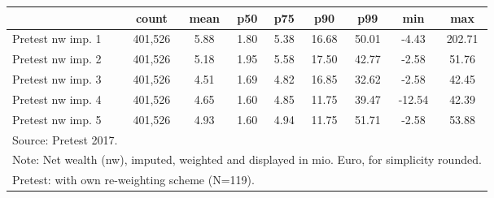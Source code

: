 {
\def\sym#1{\ifmmode^{#1}\else\(^{#1}\)\fi}
\begin{tabular}{l*{1}{cccccccc}}
\hline\hline
                                            &       count&        mean&         p50&         p75&         p90&         p99&         min&         max\\
\hline
Pretest nw imp. 1                           &     401,526&        5.88&        1.80&        5.38&       16.68&       50.01&       -4.43&      202.71\\
Pretest nw imp. 2                           &     401,526&        5.18&        1.95&        5.58&       17.50&       42.77&       -2.58&       51.76\\
Pretest nw imp. 3                           &     401,526&        4.51&        1.69&        4.82&       16.85&       32.62&       -2.58&       42.45\\
Pretest nw imp. 4                           &     401,526&        4.65&        1.60&        4.85&       11.75&       39.47&      -12.54&       42.39\\
Pretest nw imp. 5                           &     401,526&        4.93&        1.60&        4.94&       11.75&       51.71&       -2.58&       53.88\\
\hline\hline
\multicolumn{9}{l}{\footnotesize Source: Pretest 2017.}\\
\multicolumn{9}{l}{\footnotesize Note: Net wealth (nw), imputed, weighted and displayed in mio. Euro, for simplicity rounded.}\\
\multicolumn{9}{l}{\footnotesize Pretest: with own re-weighting scheme (N=119).}\\
\end{tabular}
}

